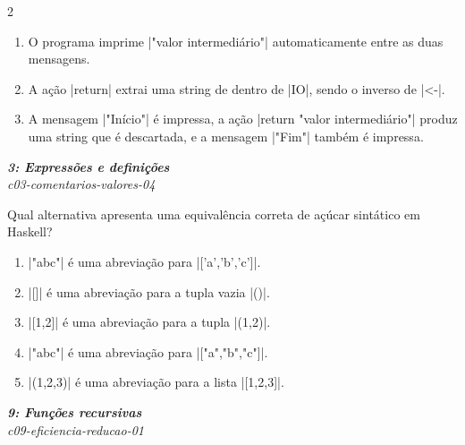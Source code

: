 \documentclass[a4paper,10pt,brazil]{article}
\begin{document}
\begin{multicols}{2}
\begin{enumerate}
  \item O programa imprime \haskellinline|"valor intermediário"| automaticamente entre as duas mensagens.

  \item A ação \haskellinline|return| extrai uma string de dentro de \haskellinline|IO|, sendo o inverso de \haskellinline|<-|.

  \item A mensagem \haskellinline|"Início"| é impressa, a ação \haskellinline|return "valor intermediário"| produz uma string que é descartada, e a mensagem \haskellinline|"Fim"| também é impressa.


\end{enumerate}

\begin{flushright}
  \footnotesize
  \textit{\textbf{3: Expressões e definições}}\\
  \textit{c03-comentarios-valores-04}\\

\end{flushright}
Qual alternativa apresenta uma equivalência correta de açúcar sintático em Haskell?

\begin{enumerate}
  \item \haskellinline|"abc"| é uma abreviação para \haskellinline|['a','b','c']|.

  \item \haskellinline|[]| é uma abreviação para a tupla vazia \haskellinline|()|.

  \item \haskellinline|[1,2]| é uma abreviação para a tupla \haskellinline|(1,2)|.

  \item \haskellinline|"abc"| é uma abreviação para \haskellinline|["a","b","c"]|.

  \item \haskellinline|(1,2,3)| é uma abreviação para a lista \haskellinline|[1,2,3]|.


\end{enumerate}

\begin{flushright}
  \footnotesize
  \textit{\textbf{9: Funções recursivas}}\\
  \textit{c09-eficiencia-reducao-01}\\


\end{flushright}
\end{multicols}
\end{document}
